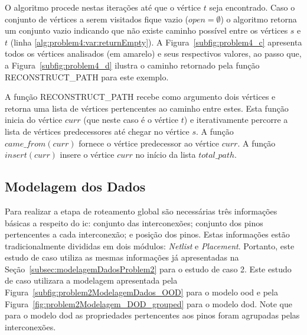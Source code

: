 O algoritmo procede nestas iterações até que o vértice $t$ seja encontrado. Caso o conjunto de vértices a serem visitados fique vazio ($open = \emptyset$) o algoritmo retorna um conjunto vazio indicando que não existe caminho possível entre os vértices $s$ e $t$ (linha \ref{alg:problem4:var:returnEmpty}).
A Figura~\ref{subfig:problem4_c} apresenta todos os vértices analisados (em amarelo) e seus respectivos valores, ao passo que, a Figura~\ref{subfig:problem4_d} ilustra o caminho retornado pela função  RECONSTRUCT\_PATH para este exemplo.

A função RECONSTRUCT\_PATH recebe como argumento dois vértices e retorna uma lista de vértices pertencentes ao caminho entre estes.
Esta função inicia do vértice $curr$ (que neste caso é o vértice $t$) e iterativamente percorre a lista de vértices predecessores até chegar no vértice $s$.
A função $came\_from(curr)$ fornece o vértice predecessor ao vértice $curr$.
A função $insert(curr)$ insere o vértice $curr$ no início da lista $total\_path$.


\subsection{Modelagem dos Dados}

Para realizar a etapa de roteamento global são necessárias três informações básicas a respeito do \ac{ic}: conjunto das interconexões; conjunto dos pinos pertencentes a cada interconexão; e posição dos pinos.
Estas informações estão tradicionalmente divididas em dois módulos: \textit{Netlist} e \textit{Placement}.
Portanto, este estudo de caso utiliza as mesmas informações já apresentadas na Seção~\ref{subsec:modelagemDadosProblem2} para o estudo de caso 2.
Este estudo de caso utilizara a modelagem apresentada pela Figura~\ref{subfig:problem2ModelagemDados_OOD} para o modelo \ac{ood} e pela Figura~\ref{fig:problem2Modelagem_DOD_grouped} para o modelo \ac{dod}.
Note que para o modelo \ac{dod} as propriedades pertencentes aos pinos foram agrupadas pelas interconexões.

